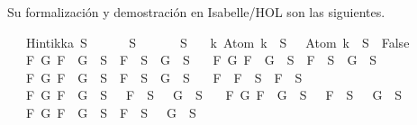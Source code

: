 \begin{isabellebody}
\begin{isamarkuptext}
  Su formalización y demostración en Isabelle/HOL son las siguientes.%
\end{isamarkuptext}\isamarkuptrue%
\isamarkupfalse%
\isanewline
\ \ \ {\isachardoublequoteopen}Hintikka\ S{\isachardoublequoteclose}\ \isanewline
\ \ \ {\isachardoublequoteopen}{\isasymbottom}\ {\isasymnotin}\ S{\isachardoublequoteclose}\isanewline
%
\isadelimproof
%
\endisadelimproof
%
\isatagproof
{}\isamarkupfalse%
\ {\isacharminus}\isanewline
\ \isamarkupfalse%
\ {\isachardoublequoteopen}{\isasymbottom}\ {\isasymnotin}\ S\isanewline
\ \ {\isasymand}\ {\isacharparenleft}{\isasymforall}k{\isachardot}\ Atom\ k\ {\isasymin}\ S\ {\isasymlongrightarrow}\ \isactrlbold {\isasymnot}\ {\isacharparenleft}Atom\ k{\isacharparenright}\ {\isasymin}\ S\ {\isasymlongrightarrow}\ False{\isacharparenright}\isanewline
\ \ {\isasymand}\ {\isacharparenleft}{\isasymforall}F\ G{\isachardot}\ F\ \isactrlbold {\isasymand}\ G\ {\isasymin}\ S\ {\isasymlongrightarrow}\ F\ {\isasymin}\ S\ {\isasymand}\ G\ {\isasymin}\ S{\isacharparenright}\isanewline
\ \ {\isasymand}\ {\isacharparenleft}{\isasymforall}F\ G{\isachardot}\ F\ \isactrlbold {\isasymor}\ G\ {\isasymin}\ S\ {\isasymlongrightarrow}\ F\ {\isasymin}\ S\ {\isasymor}\ G\ {\isasymin}\ S{\isacharparenright}\isanewline
\ \ {\isasymand}\ {\isacharparenleft}{\isasymforall}F\ G{\isachardot}\ F\ \isactrlbold {\isasymrightarrow}\ G\ {\isasymin}\ S\ {\isasymlongrightarrow}\ \isactrlbold {\isasymnot}F\ {\isasymin}\ S\ {\isasymor}\ G\ {\isasymin}\ S{\isacharparenright}\isanewline
\ \ {\isasymand}\ {\isacharparenleft}{\isasymforall}F{\isachardot}\ \isactrlbold {\isasymnot}\ {\isacharparenleft}\isactrlbold {\isasymnot}F{\isacharparenright}\ {\isasymin}\ S\ {\isasymlongrightarrow}\ F\ {\isasymin}\ S{\isacharparenright}\isanewline
\ \ {\isasymand}\ {\isacharparenleft}{\isasymforall}F\ G{\isachardot}\ \isactrlbold {\isasymnot}{\isacharparenleft}F\ \isactrlbold {\isasymand}\ G{\isacharparenright}\ {\isasymin}\ S\ {\isasymlongrightarrow}\ \isactrlbold {\isasymnot}\ F\ {\isasymin}\ S\ {\isasymor}\ \isactrlbold {\isasymnot}\ G\ {\isasymin}\ S{\isacharparenright}\isanewline
\ \ {\isasymand}\ {\isacharparenleft}{\isasymforall}F\ G{\isachardot}\ \isactrlbold {\isasymnot}{\isacharparenleft}F\ \isactrlbold {\isasymor}\ G{\isacharparenright}\ {\isasymin}\ S\ {\isasymlongrightarrow}\ \isactrlbold {\isasymnot}\ F\ {\isasymin}\ S\ {\isasymand}\ \isactrlbold {\isasymnot}\ G\ {\isasymin}\ S{\isacharparenright}\isanewline
\ \ {\isasymand}\ {\isacharparenleft}{\isasymforall}F\ G{\isachardot}\ \isactrlbold {\isasymnot}{\isacharparenleft}F\ \isactrlbold {\isasymrightarrow}\ G{\isacharparenright}\ {\isasymin}\ S\ {\isasymlongrightarrow}\ F\ {\isasymin}\ S\ {\isasymand}\ \isactrlbold {\isasymnot}\ G\ {\isasymin}\ S{\isacharparenright}{\isachardoublequoteclose}\isanewline

\end{isabellebody}
